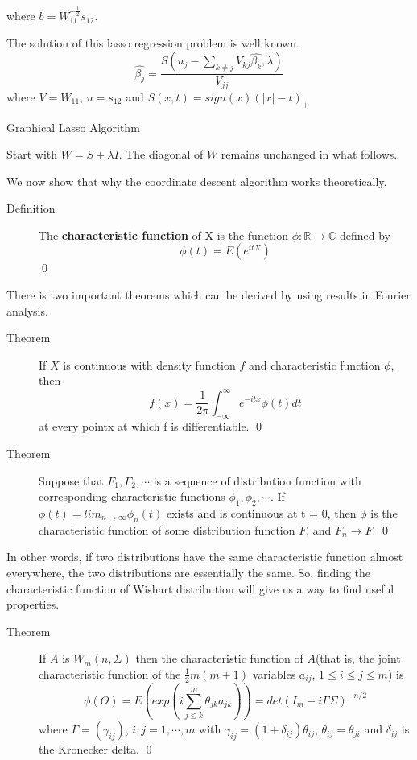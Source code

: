 \documentclass[openany]{memoir}
\begin{document}
where $b=W_{11}^{-\frac{1}{2}}s_{12}$.

The solution of this lasso regression problem is well known.
$$\hat{\beta_{j}} = \frac{S(u_j - \sum_{k \neq j} V_{kj}\hat{\beta_k}, \lambda)}{V_{jj}}$$
where $V=W_{11}$, $u = s_{12}$ and $S(x, t)=sign(x)(|x| - t)_{+}$

\begin{algorithm}
\caption{Graphical Lasso Algorithm}
\begin{algorithmic}[1]
\STATE Start with $W = S + \lambda I$. The diagonal of $W$ remains unchanged in what follows.
\ENDFOR
\ENDWHILE
\end{algorithmic}
\end{algorithm}

We now show that why the coordinate descent algorithm works theoretically.

\begin{description}
\item[Definition] The \textbf{characteristic function} of X is the function $\phi : \mathbb{R} \rightarrow \mathbb{C}$ defined by
$$\phi(t) = E(e^{itX})$$ \qed
\end{description}

There is two important theorems which can be derived by using results in Fourier analysis.

\begin{description}
\item[Theorem] If $X$ is continuous with density function $f$ and characteristic function $\phi$, then
$$f(x) = \frac{1}{2\pi} \int_{-\infty}^{\infty} e^{-itx}\phi(t)dt$$
at every pointx at which f is differentiable. \qed

\item[Theorem] Suppose that $F_1,F_2,\cdots$ is a sequence of distribution function with corresponding characteristic functions $\phi_1,\phi_2,\cdots$. If $\phi(t)=lim_{n \rightarrow \infty} \phi_n(t)$ exists and is continuous at t = 0, then $\phi$ is the characteristic function of some distribution function $F$, and $F_n \rightarrow F$. \qed
\end{description}

In other words, if two distributions have the same characteristic function almost everywhere, the two distributions are essentially the same. So, finding the characteristic function of Wishart distribution will give us a way to find useful properties.

\begin{description}
\item[Theorem] If $A$ is $W_m(n, \Sigma)$ then the characteristic function of $A$(that is, the joint characteristic function of the $\frac{1}{2}m(m+1)$ variables $a_{ij}$, $1 \leq i \leq j \leq m$) is
$$\phi(\Theta)=E(exp(i\sum_{j \leq k}^{m}\theta_{jk}a_{jk}))=det(I_m - i\Gamma\Sigma)^{-n/2}$$
where $\Gamma = (\gamma_{ij})$, $i,j=1,\cdots,m$ with $\gamma_{ij}=(1+\delta_{ij})\theta_{ij}$, $\theta_{ij}=\theta_{ji}$ and $\delta_{ij}$ is the Kronecker delta. \qed
\end{description}
\end{document}
